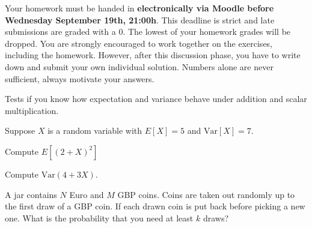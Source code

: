 \documentclass[a4paper,10pt,landscape,twocolumn]{scrartcl}
\newcommand\deadline{Wednesday September 19th, 21:00h}
\begin{document}
\homeworkproblems

{\sffamily\noindent
Your homework must be handed in \textbf{electronically via Moodle before \deadline}. This deadline is strict and late submissions are graded with a 0. The lowest of your homework grades will be dropped. You are strongly encouraged to work together on the exercises, including the homework. However, after this discussion phase, you have to write down and submit your own individual solution. Numbers alone are never sufficient, always motivate your answers.
}



\begin{exercise}[(2pt)]
\begin{mycomment}
	Tests if you know how expectation and variance behave under addition and scalar multiplication.
\end{mycomment}

Suppose $X$ is a random variable with $E[X] = 5$ and $\mathrm{Var}[X] = 7$.	
\begin{subex}
Compute $E[(2+X)^2]$
\end{subex}	

\begin{subex}
Compute $\mathrm{Var}(4+3X)$.
\end{subex}

\end{exercise}


\begin{exercise}[(2pt)]
A jar contains $N$ Euro and $M$ GBP coins. Coins are taken out randomly up to the first draw of a GBP coin. If each drawn coin is put back before picking a new one. What is the probability that you need at least $k$ draws?
%

\end{exercise}
\end{document}
